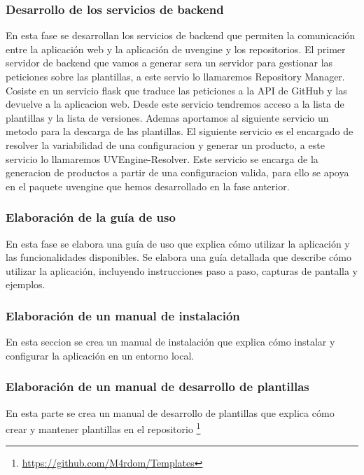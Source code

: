 \documentclass[12pt, a4paper, twoside]{article}
\begin{document}
\subsubsection{Desarrollo de los servicios de backend}
\label{sec:Desarrollo de los servicios de backend}
En esta fase se desarrollan los servicios de backend que permiten la comunicación entre la aplicación web y la aplicación de uvengine y los repositorios.
El primer servidor de backend que vamos a generar sera un servidor para gestionar las peticiones sobre las plantillas, a este servio lo llamaremos Repository Manager. 
Cosiste en un servicio flask que traduce las peticiones a la API de GitHub y las devuelve a la aplicacion web. Desde este servicio tendremos acceso a la lista de plantillas y la lista de versiones.
Ademas aportamos al siguiente servicio un metodo para la descarga de las plantillas. El siguiente servicio es el encargado de resolver la variabilidad de una configuracion y generar un producto, a este servicio lo llamaremos UVEngine-Resolver.
Este servicio se encarga de la generacion de productos a partir de una configuracion valida, para ello se apoya en el paquete uvengine que hemos desarrollado en la fase anterior.

\subsubsection{Elaboración de la guía de uso}
En esta fase se elabora una guía de uso que explica cómo utilizar la aplicación y las funcionalidades disponibles.
Se elabora una guía detallada que describe cómo utilizar la aplicación, incluyendo instrucciones paso a paso, capturas 
de pantalla y ejemplos. 
\subsubsection{Elaboración de un manual de instalación}
En esta seccion se crea un manual de instalación que explica cómo instalar y configurar la aplicación en un entorno local.
\subsubsection{Elaboración de un manual de desarrollo de plantillas}
En esta parte se crea un manual de desarrollo de plantillas que explica cómo crear y mantener plantillas en el repositorio \footnote{\href{https://github.com/M4rdom/Templates}{https://github.com/M4rdom/Templates}}
\end{document}
